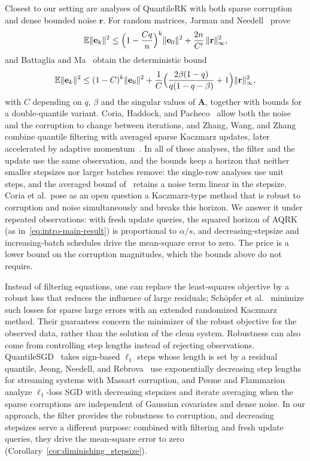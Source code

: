 \documentclass[pdflatex,sn-mathphys-num]{sn-jnl}
\theoremstyle{thmstyleone}
\theoremstyle{thmstylethree}
\newcommand{\mA}{\mathbf{A}}
\newcommand{\ve}{\mathbf{e}}
\newcommand{\vr}{\mathbf{r}}
\begin{document}
Closest to our setting are analyses of QuantileRK with both sparse corruption
and dense bounded noise $\vr$. For random matrices, Jarman and
Needell~\cite{jarman2021quantilerk} prove
\[
\mathbb E\|\ve_k\|^2\le\Bigl(1-\frac{Cq}{n}\Bigr)^k\|\ve_0\|^2
+\frac{2n}{C'}\,\|\vr\|_\infty^2 ,
\]
and Battaglia and Ma~\cite{battaglia2025qrkdoublequantilerkerror} obtain the
deterministic bound
\[
\mathbb E\|\ve_k\|^2\le(1-C)^k\|\ve_0\|^2
+\frac1C\Bigl(\frac{2\beta(1-q)}{q(1-q-\beta)}+1\Bigr)\|\vr\|_\infty^2 ,
\]
with $C$ depending on $q$, $\beta$ and the singular values of $\mA$, together
with bounds for a double-quantile variant. Coria, Haddock, and
Pacheco~\cite{coria2024quantile} allow both the noise and the corruption to
change between iterations, and Zhang, Wang, and
Zhang~\cite{zhang2025quantilesparse} combine quantile filtering with averaged
sparse Kaczmarz updates, later accelerated by adaptive
momentum~\cite{zhang2026momentum}. In all of these analyses, the filter and
the update use the same observation, and the bounds keep a horizon that
neither smaller stepsizes nor larger batches remove: the single-row analyses
use unit steps, and the averaged bound of~\cite{zhang2025quantilesparse}
retains a noise term linear in the stepsize. Coria et al.\ pose as an open
question a Kaczmarz-type method that is robust to corruption and noise
simultaneously and breaks this horizon.
We answer it under repeated
observations: with fresh update queries, the squared horizon of AQRK
(as in~\eqref{eq:intro-main-result}) is proportional to $\alpha/s$, and
decreasing-stepsize and increasing-batch schedules drive the mean-square
error to zero. The price is a lower bound on the corruption magnitudes, which
the bounds above do not require. 

Instead of filtering equations, one can replace the least-squares objective
by a robust loss that reduces the influence of large residuals; Schöpfer et
al.~\cite{schopfer2022extended} minimize such losses for sparse large errors
with an extended randomized Kaczmarz method. Their guarantees concern the
minimizer of the robust objective for the observed data, rather than the
solution of the clean system. Robustness can also come from controlling step
lengths instead of rejecting observations. QuantileSGD~\cite{haddock2022quantilebased}
takes sign-based $\ell_1$ steps whose length is set by a residual quantile,
Jeong, Needell, and Rebrova~\cite{jeong2024stochastic} use exponentially
decreasing step lengths for streaming systems with Massart corruption, and
Pesme and Flammarion~\cite{pesme2020online} analyze $\ell_1$-loss SGD with
decreasing stepsizes and iterate averaging when the sparse corruptions are
independent of Gaussian covariates and dense noise. In our approach, the filter
provides the robustness to corruption, and decreasing stepsizes serve a
different purpose: combined with filtering and fresh update queries, they drive
the mean-square error to zero
(Corollary~\ref{cor:diminishing_stepsize}).
\end{document}
